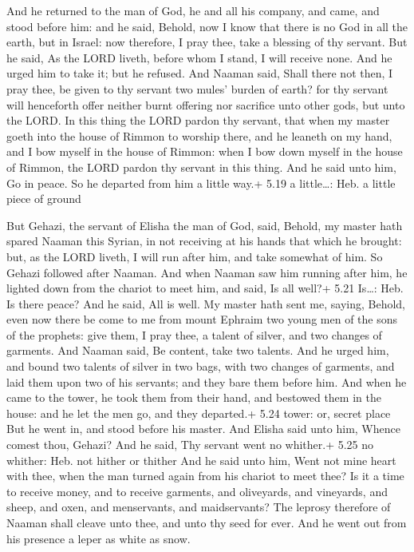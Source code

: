  And he returned to the man of God, he and all his
company, and came, and stood before him: and he said, Behold, now I know
that there is no God in all the earth, but in Israel: now therefore, I
pray thee, take a blessing of thy servant.  But he said, As
the LORD liveth, before whom I stand, I will receive none. And he urged
him to take it; but he refused.  And Naaman said, Shall
there not then, I pray thee, be given to thy servant two mules' burden
of earth? for thy servant will henceforth offer neither burnt offering
nor sacrifice unto other gods, but unto the LORD.  In this
thing the LORD pardon thy servant, that when my master goeth into the
house of Rimmon to worship there, and he leaneth on my hand, and I bow
myself in the house of Rimmon: when I bow down myself in the house of
Rimmon, the LORD pardon thy servant in this thing.  And he
said unto him, Go in peace. So he departed from him a little way.+ 5.19
a little\ldots: Heb. a little piece of ground

 But Gehazi, the servant of Elisha the man of God, said,
Behold, my master hath spared Naaman this Syrian, in not receiving at
his hands that which he brought: but, as the LORD liveth, I will run
after him, and take somewhat of him.  So Gehazi followed
after Naaman. And when Naaman saw him running after him, he lighted down
from the chariot to meet him, and said, Is all well?+ 5.21 Is\ldots:
Heb. Is there peace?  And he said, All is well. My master
hath sent me, saying, Behold, even now there be come to me from mount
Ephraim two young men of the sons of the prophets: give them, I pray
thee, a talent of silver, and two changes of garments.  And
Naaman said, Be content, take two talents. And he urged him, and bound
two talents of silver in two bags, with two changes of garments, and
laid them upon two of his servants; and they bare them before him.
 And when he came to the tower, he took them from their
hand, and bestowed them in the house: and he let the men go, and they
departed.+ 5.24 tower: or, secret place  But he went in,
and stood before his master. And Elisha said unto him, Whence comest
thou, Gehazi? And he said, Thy servant went no whither.+ 5.25 no
whither: Heb. not hither or thither  And he said unto him,
Went not mine heart with thee, when the man turned again from his
chariot to meet thee? Is it a time to receive money, and to receive
garments, and oliveyards, and vineyards, and sheep, and oxen, and
menservants, and maidservants?  The leprosy therefore of
Naaman shall cleave unto thee, and unto thy seed for ever. And he went
out from his presence a leper as white as snow.

